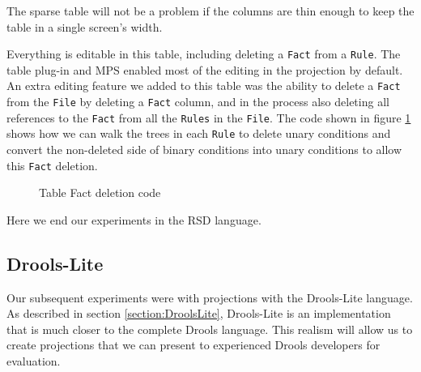 The sparse table will not be a problem if the columns are thin enough to keep the table in a single screen's width.

Everything is editable in this table, including deleting a \texttt{Fact} from a \texttt{Rule}.
The table plug-in and MPS enabled most of the editing in the projection by default.
An extra editing feature we added to this table was the ability to delete a \texttt{Fact} from the \texttt{File} by deleting a \texttt{Fact} column, and in the process also deleting all references to the \texttt{Fact} from all the \texttt{Rules} in the \texttt{File}.
The code shown in figure \ref{fig:tableFactDeletion} shows how we can walk the trees in each \texttt{Rule} to delete unary conditions and convert the non-deleted side of binary conditions into unary conditions to allow this \texttt{Fact} deletion.

\begin{figure}
    \centering
    \caption{Table Fact deletion code}
    \label{fig:tableFactDeletion}
\end{figure}

Here we end our experiments in the RSD language.

\subsection{Drools-Lite}

Our subsequent experiments were with projections with the Drools-Lite language.
As described in section \ref{section:DroolsLite}, Drools-Lite is an implementation that is much closer to the complete Drools language.
This realism will allow us to create projections that we can present to experienced Drools developers for evaluation.

